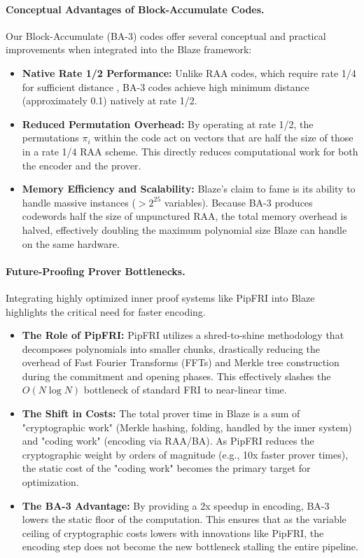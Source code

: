  \paragraph{Conceptual Advantages of Block-Accumulate Codes.} Our Block-Accumulate (BA-3) codes offer several conceptual and practical improvements when integrated into the Blaze framework:
 \begin{itemize}
    \item {\bf Native Rate 1/2 Performance:} Unlike RAA codes, which require rate 1/4 for sufficient distance , BA-3 codes achieve high minimum distance (approximately 0.1) natively at rate 1/2.

    \item {\bf Reduced Permutation Overhead:} By operating at rate 1/2, the permutations $\pi_i$ within the code act on vectors that are half the size of those in a rate 1/4 RAA scheme. This directly reduces computational work for both the encoder and the prover.

    \item {\bf Memory Efficiency and Scalability:} Blaze's claim to fame is its ability to handle massive instances ($>2^{25}$ variables). Because BA-3 produces codewords half the size of unpunctured RAA, the total memory overhead is halved, effectively doubling the maximum polynomial size Blaze can handle on the same hardware.
 \end{itemize}
 
 
\paragraph{Future-Proofing Prover Bottlenecks.}
Integrating highly optimized inner proof systems like PipFRI into Blaze highlights the critical need for faster encoding.
 \begin{itemize}
    \item {\bf The Role of PipFRI: } PipFRI utilizes a shred-to-shine methodology that decomposes polynomials into smaller chunks, drastically reducing the overhead of Fast Fourier Transforms (FFTs) and Merkle tree construction during the commitment and opening phases. This effectively slashes the $O(N \log N)$ bottleneck of standard FRI to near-linear time.

    \item {\bf The Shift in Costs: } The total prover time in Blaze is a sum of "cryptographic work" (Merkle hashing, folding, handled by the inner system) and "coding work" (encoding via RAA/BA). As PipFRI reduces the cryptographic weight by orders of magnitude (e.g., 10x faster prover times), the static cost of the "coding work" becomes the primary target for optimization.

    \item {\bf The BA-3 Advantage: } By providing a 2x speedup in encoding, BA-3 lowers the static floor of the computation. This ensures that as the variable ceiling of cryptographic costs lowers with innovations like PipFRI, the encoding step does not become the new bottleneck stalling the entire pipeline.
\end{itemize}